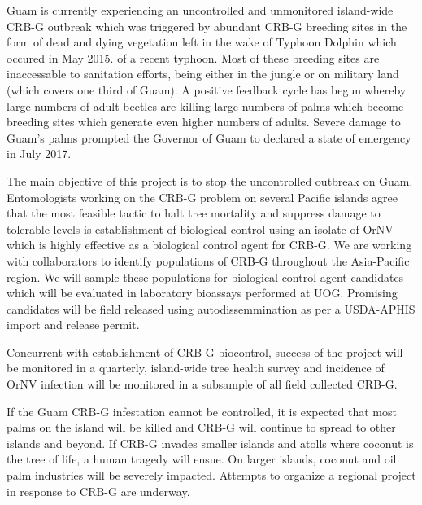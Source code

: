 \documentclass[12pt,english]{scrartcl}
\begin{document}
Guam is currently experiencing an uncontrolled and unmonitored island-wide
CRB-G outbreak which was triggered by abundant CRB-G breeding sites
in the form of dead and dying vegetation left in the wake of Typhoon
Dolphin which occured in May 2015. of a recent typhoon. Most of these
breeding sites are inaccessable to sanitation efforts, being either
in the jungle or on military land (which covers one third of Guam).
A positive feedback cycle has begun whereby large numbers of adult
beetles are killing large numbers of palms which become breeding sites
which generate even higher numbers of adults. Severe damage to Guam\textquoteright s
palms prompted the Governor of Guam to declared a state of emergency
in July 2017.

The main objective of this project is to stop the uncontrolled outbreak
on Guam. Entomologists working on the CRB-G problem on several Pacific
islands agree that the most feasible tactic to halt tree mortality
and suppress damage to tolerable levels is establishment of biological
control using an isolate of OrNV which is highly effective as a biological
control agent for CRB-G. We are working with collaborators to identify
populations of CRB-G throughout the Asia-Pacific region. We will sample
these populations for biological control agent candidates which will
be evaluated in laboratory bioassays performed at UOG. Promising candidates
will be field released using autodissemmination as per a USDA-APHIS
import and release permit.

Concurrent with establishment of CRB-G biocontrol, success of the
project will be monitored in a quarterly, island-wide tree health
survey and incidence of OrNV infection will be monitored in a subsample
of all field collected CRB-G.

If the Guam CRB-G infestation cannot be controlled, it is expected
that most palms on the island will be killed and CRB-G will continue
to spread to other islands and beyond. If CRB-G invades smaller islands
and atolls where coconut is the tree of life, a human tragedy will
ensue. On larger islands, coconut and oil palm industries will be
severely impacted. Attempts to organize a regional project in response
to CRB-G are underway.
\end{document}
